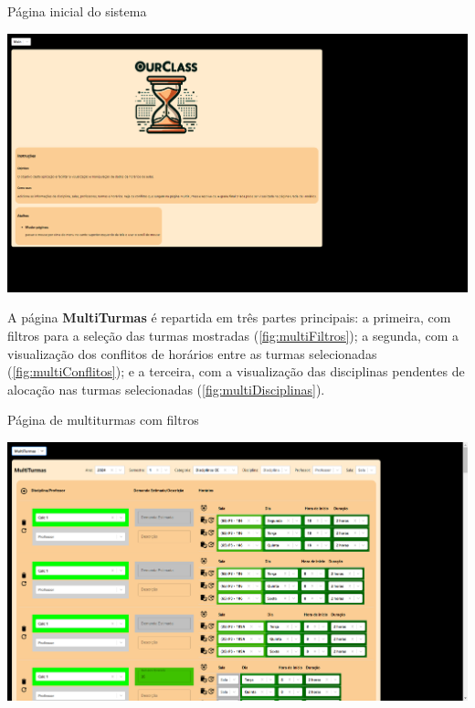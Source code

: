 \begin{MyCenteredFigure} \caption{Página inicial do sistema} \label{fig:main}
  \includegraphics[width=\textwidth]{files/img/2.02!7-resultados/1-Main.png}
\end{MyCenteredFigure}

A página \textbf{MultiTurmas} é repartida em três partes principais: a primeira, com filtros para a seleção das turmas mostradas (\autoref{fig:multiFiltros}); a segunda, com a visualização dos conflitos de horários entre as turmas selecionadas (\autoref{fig:multiConflitos}); e a terceira, com a visualização das disciplinas pendentes de alocação nas turmas selecionadas (\autoref{fig:multiDisciplinas}).

\begin{MyCenteredFigure} \caption{Página de multiturmas com filtros} \label{fig:multiFiltros}
  \includegraphics[width=\textwidth]{files/img/2.02!7-resultados/2-Multiturmas-Filtros.png}
\end{MyCenteredFigure}

